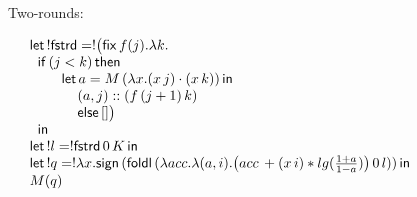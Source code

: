 \documentclass{article}
\begin{document}
\begin{figure}

Two-rounds:

\[
\begin{array}{l}
 \mathsf{let}\, !\mathsf{fstrd} = ! \big( \mathsf{fix} \, f(j). \lambda k.  \\
 \hspace{.2cm} \mathsf{if}\, (j < k) \, \mathsf{then} \\
  \hspace{.8cm} \mathsf{let} \, a = M \, ( \lambda x. (x \,j)\cdot (x \,k) )  \, \mathsf{in} \\
  \hspace{1.2cm} (a, j) :: (f  \,(j+1) \, k) \\
 \hspace{1.2cm} \mathsf{else} \, [] \big) \\
  \hspace{.2cm} \mathsf{in} \\
  \mathsf{let}\, !l = !\mathsf{fstrd} \, 0\, K \, \mathsf{in} \\
  \mathsf{let} \, ! q = ! \lambda x. \mathsf{sign} \, (\mathsf{foldl} \, (\lambda acc. \lambda (a,i). \big(acc\,+ (x \, i) *lg(\frac{1+a}{1-a})  \big) \, 0 \, l )) \, \mathsf{in} \\
  M ( q )
\end{array}
\]


\end{figure}
\end{document}
